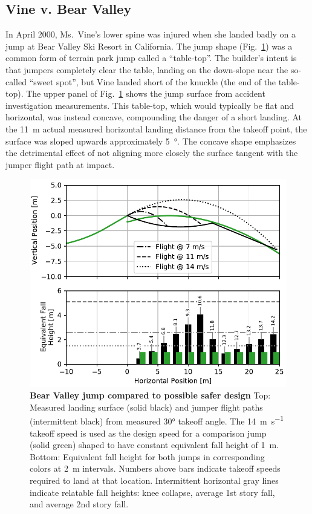 \documentclass[smallextended]{svjour3}       %
\begin{document}
\subsection{Vine v. Bear Valley}
\label{sec:vine}
%
In April 2000, Ms.~Vine's lower spine was injured when she landed badly on a jump at
Bear Valley Ski Resort in California. The jump shape
(Fig.~\ref{fig:vine-v-bear-valley}) was a common form of terrain park jump
called a ``table-top''. The builder's intent is that jumpers completely clear
the table, landing on the down-slope near the so-called ``sweet spot'', but
Vine landed short of the knuckle (the end of the table-top). The upper panel of
Fig.~\ref{fig:vine-v-bear-valley} shows the jump surface from accident
investigation measurements. This table-top, which would typically be flat and
horizontal, was instead concave, compounding the danger of a short landing. At
the 11~\si{\meter} actual measured horizontal landing distance from the takeoff
point, the surface was sloped upwards approximately 5~\si{\degree}. The concave
shape emphasizes the detrimental effect of not aligning more closely the
surface tangent with the jumper flight path at impact.
%
\begin{figure}
  \centering
  \includegraphics[width=5.25in]{figures/vine-v-bear-valley.pdf}
  \caption{\textbf{Bear Valley jump compared to possible safer design}
  Top: Measured landing surface (solid black) and jumper flight paths
  (intermittent black) from measured 30\si{\degree} takeoff angle. The
  14~\si{\meter\per\second} takeoff speed is used as the design speed \cite{Levy2015} for a
  comparison jump (solid green) shaped to have constant equivalent fall
  height of 1~\si{\meter}.
  Bottom: Equivalent fall height for both jumps in corresponding
  colors at 2~\si{\meter} intervals. Numbers above bars indicate
  takeoff speeds required to land at that location.
  Intermittent horizontal gray lines indicate relatable fall heights: knee
  collapse, average 1st story fall, and average 2nd story fall.
  }
  \label{fig:vine-v-bear-valley}
\end{figure}
\end{document}
